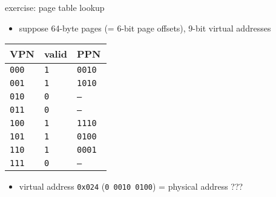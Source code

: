 \begin{frame}{exercise: page table lookup}
    \begin{itemize}
    \item suppose 64-byte pages (= 6-bit page offsets), 9-bit virtual addresses
    \end{itemize}
\begin{tabular}{l|l|l}
VPN & valid & PPN \\ \hline
\tt 000 & \tt 1 & \tt 0010 \\ \hline
\tt 001 & \tt 1 & \tt 1010 \\ \hline
\tt 010 & \tt 0 & \tt --- \\ \hline
\tt 011 & \tt 0 & \tt --- \\ \hline
\tt 100 & \tt 1 & \tt 1110 \\ \hline
\tt 101 & \tt 1 & \tt 0100 \\ \hline
\tt 110 & \tt 1 & \tt 0001 \\ \hline
\tt 111 & \tt 0 & \tt --- \\ \hline
\end{tabular}
    \begin{itemize}
    \item virtual address {\tt 0x024} ({\tt 0 0010 0100}) = physical address ???
    \end{itemize}
\end{frame}
